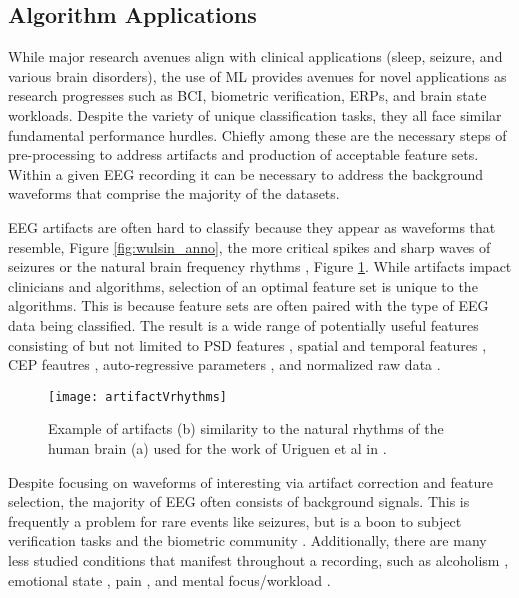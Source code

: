 \subsection{Algorithm Applications}

While major research avenues align with clinical applications (sleep, seizure, and various brain disorders), the use of \ac{ML} provides avenues for novel applications as research progresses such as \ac{BCI}, biometric verification, \acp{ERP}, and brain state workloads. Despite the variety of unique classification tasks, they all face similar fundamental performance hurdles. Chiefly among these are the necessary steps of pre-processing to address artifacts and production of acceptable feature sets. Within a given \ac{EEG} recording it can be necessary to address the background waveforms that comprise the majority of the datasets.

\ac{EEG} artifacts are often hard to classify because they appear as waveforms that resemble, Figure \ref{fig:wulsin_anno}, the more critical spikes and sharp waves of seizures \cite{Halford2017} or the natural brain frequency rhythms \cite{Uriguen2015}, Figure \ref{fig:artifactVrhythm}. While artifacts impact clinicians and algorithms, selection of an optimal feature set is unique to the algorithms. This is because feature sets are often paired with the type of \ac{EEG} data being classified. The result is a wide range of potentially useful features consisting of but not limited to \ac{PSD} features \cite{Gui2015}, spatial and temporal features \cite{Mognon2011}, \ac{CEP} feautres \cite{Harati2015a}, auto-regressive parameters \cite{Marcano2018}, and normalized raw data \cite{Acharya2018}.

\begin{figure}
\centering
\texttt{[image: artifactVrhythms]}
\caption[Artifact example]{Example of artifacts (b) similarity to the natural rhythms of the human brain (a) used for the work of Uriguen et al in \cite{Uriguen2015}.}
\label{fig:artifactVrhythm}
\end{figure}

Despite focusing on waveforms of interesting via artifact correction and feature selection, the majority of \ac{EEG} often consists of background signals\cite{Wulsin2011,Rakthanmanon2012,Uriguen2015}. This is frequently a problem for rare events like seizures, but is a boon to subject verification tasks and the biometric community \cite{Campisi2014}. Additionally, there are many less studied conditions that manifest throughout a recording, such as alcoholism \cite{Porjesz2005}, emotional state \cite{Coan2004}, pain \cite{Schulz2012}, and mental focus/workload \cite{Schultze-Kraft2016}.

